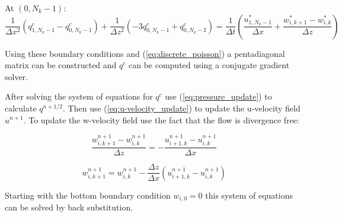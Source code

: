 \documentclass[12pt]{article}
\begin{document}
At $(0,N_k-1)$:
\begin{equation*}
\frac{1}{\Delta x^2} (q_{1,N_k-1}^c -  q_{0,N_k-1}^c ) 
+ \frac{1}{\Delta z^2} (-3 q_{0,N_k-1}^c + q_{0,N_k-2}^c) = \frac{1}{\Delta t} \left( \frac{u_{1,N_k-1}^* }{\Delta x}  + \frac{w_{i,k+1}^* - w_{i,k}^*}{\Delta z}\right)
\end{equation*}

Using these boundary conditions and (\ref{eq:discrete_poisson}) a pentadiagonal matrix can be constructed and $q^c$ can be computed using a conjugate gradient solver.

After solving the system of equations for $q^c$ use (\ref{eq:pressure_update}) to calculate $q^{n+1/2}$. Then use (\ref{eq:u-velocity_update}) to update the u-velocity field $u^{n+1}$. To update the w-velocity field use the fact that the flow is divergence free:

\begin{equation*}
\frac{w_{i,k+1}^{n+1} - w_{i,k}^{n+1}}{\Delta z} = - \frac{u_{i+1,k}^{n+1} - u_{i,k}^{n+1}}{\Delta x}
\end{equation*}

\begin{equation*}
w_{i,k+1}^{n+1} = w_{i,k}^{n+1} - \frac{\Delta z}{\Delta x} (u_{i+1,k}^{n+1} - u_{i,k}^{n+1})
\end{equation*}

Starting with the bottom boundary condition $w_{i,0} = 0$ this system of equations can be solved by back substitution.

\section{}

\section{}

\section{}
\end{document}
